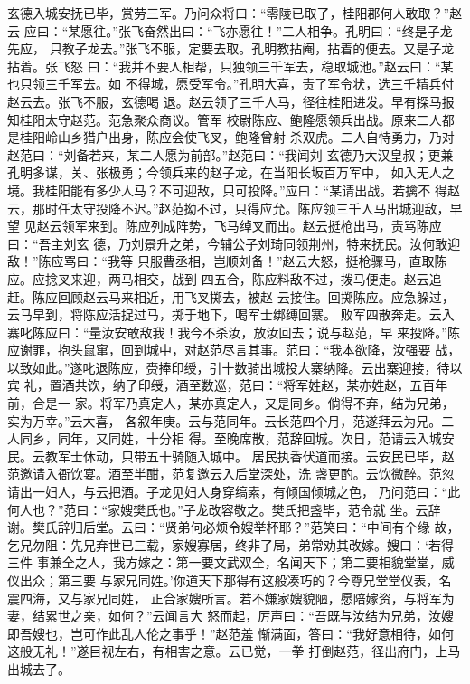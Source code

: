 玄德入城安抚已毕，赏劳三军。乃问众将曰：“零陵已取了，桂阳郡何人敢取？”赵云
应曰：“某愿往。”张飞奋然出曰：“飞亦愿往！”二人相争。孔明曰：“终是子龙先应，
只教子龙去。”张飞不服，定要去取。孔明教拈阉，拈着的便去。又是子龙拈着。张飞怒
曰：“我并不要人相帮，只独领三千军去，稳取城池。”赵云曰：“某也只领三千军去。如
不得城，愿受军令。”孔明大喜，责了军令状，选三千精兵付赵云去。张飞不服，玄德喝
退。赵云领了三千人马，径往桂阳进发。早有探马报知桂阳太守赵范。范急聚众商议。管军
校尉陈应、鲍隆愿领兵出战。原来二人都是桂阳岭山乡猎户出身，陈应会使飞叉，鲍隆曾射
杀双虎。二人自恃勇力，乃对赵范曰：“刘备若来，某二人愿为前部。”赵范曰：“我闻刘
玄德乃大汉皇叔；更兼孔明多谋，关、张极勇；今领兵来的赵子龙，在当阳长坂百万军中，
如入无人之境。我桂阳能有多少人马？不可迎敌，只可投降。”应曰：“某请出战。若擒不
得赵云，那时任太守投降不迟。”赵范拗不过，只得应允。陈应领三千人马出城迎敌，早望
见赵云领军来到。陈应列成阵势，飞马绰叉而出。赵云挺枪出马，责骂陈应曰：“吾主刘玄
德，乃刘景升之弟，今辅公子刘琦同领荆州，特来抚民。汝何敢迎敌！”陈应骂曰：“我等
只服曹丞相，岂顺刘备！”赵云大怒，挺枪骤马，直取陈应。应捻叉来迎，两马相交，战到
四五合，陈应料敌不过，拨马便走。赵云追赶。陈应回顾赵云马来相近，用飞叉掷去，被赵
云接住。回掷陈应。应急躲过，云马早到，将陈应活捉过马，掷于地下，喝军士绑缚回寨。
败军四散奔走。云入寨叱陈应曰：“量汝安敢敌我！我今不杀汝，放汝回去；说与赵范，早
来投降。”陈应谢罪，抱头鼠窜，回到城中，对赵范尽言其事。范曰：“我本欲降，汝强要
战，以致如此。”遂叱退陈应，赍捧印绶，引十数骑出城投大寨纳降。云出寨迎接，待以宾
礼，置酒共饮，纳了印绶，酒至数巡，范曰：“将军姓赵，某亦姓赵，五百年前，合是一
家。将军乃真定人，某亦真定人，又是同乡。倘得不弃，结为兄弟，实为万幸。”云大喜，
各叙年庚。云与范同年。云长范四个月，范遂拜云为兄。二人同乡，同年，又同姓，十分相
得。至晚席散，范辞回城。次日，范请云入城安民。云教军士休动，只带五十骑随入城中。
居民执香伏道而接。云安民已毕，赵范邀请入衙饮宴。酒至半酣，范复邀云入后堂深处，洗
盏更酌。云饮微醉。范忽请出一妇人，与云把酒。子龙见妇人身穿缟素，有倾国倾城之色，
乃问范曰：“此何人也？”范曰：“家嫂樊氏也。”子龙改容敬之。樊氏把盏毕，范令就
坐。云辞谢。樊氏辞归后堂。云曰：“贤弟何必烦令嫂举杯耶？”范笑曰：“中间有个缘
故，乞兄勿阻：先兄弃世已三载，家嫂寡居，终非了局，弟常劝其改嫁。嫂曰：‘若得三件
事兼全之人，我方嫁之：第一要文武双全，名闻天下；第二要相貌堂堂，威仪出众；第三要
与家兄同姓。’你道天下那得有这般凑巧的？今尊兄堂堂仪表，名震四海，又与家兄同姓，
正合家嫂所言。若不嫌家嫂貌陋，愿陪嫁资，与将军为妻，结累世之亲，如何？”云闻言大
怒而起，厉声曰：“吾既与汝结为兄弟，汝嫂即吾嫂也，岂可作此乱人伦之事乎！”赵范羞
惭满面，答曰：“我好意相待，如何这般无礼！”遂目视左右，有相害之意。云已觉，一拳
打倒赵范，径出府门，上马出城去了。

